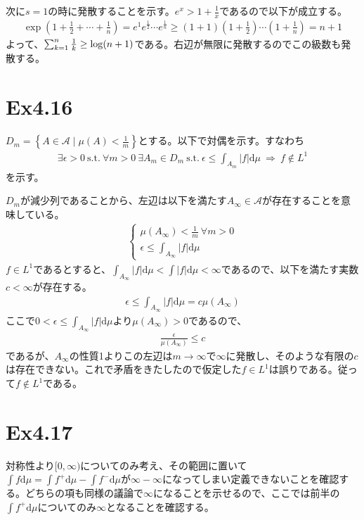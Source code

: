 \documentclass{article}
\begin{document}
次に$s = 1$の時に発散することを示す。$e^x > 1 + \frac{1}{x}$であるので以下が成立する。
\begin{align*}
	\exp \left( 1 + \frac{1}{2} + \cdots + \frac{1}{n} \right) = e^1  e^{\frac{1}{2}}\cdots e^{\frac{1}{n}} \geq (1 + 1) (1 + \frac{1}{2}) \cdots (1 + \frac{1}{n}) = n+1
\end{align*}
よって、$\sum_{k = 1}^{n} \frac{1}{k} \geq {\rm log} (n+1)$である。右辺が無限に発散するのでこの級数も発散する。

\section{Ex4.16}
$D_m = \left\{ A\in \mathcal{A}\mid \mu(A) < \frac{1}{m} \right\}$とする。以下で対偶を示す。すなわち
\begin{align*}
	\exists \epsilon > 0\ \text{s.t.}\ \forall m > 0\ \exists A_m \in D_m\ \text{s.t.}\ \epsilon \leq \int_{A_m} |f| \mathrm{d}\mu\ \Rightarrow\ f\notin L^1
\end{align*}
を示す。

$D_m$が減少列であることから、左辺は以下を満たす$A_{\infty}\in \mathcal{A}$が存在することを意味している。
\begin{align*}
\begin{cases}
	\mu\left( A_{\infty} \right) < \frac{1}{m}\ \forall m > 0\\[8pt]
	\epsilon \leq \int_{A_{\infty}} |f|\mathrm{d} \mu
\end{cases}
\end{align*}
$f\in L^1$であるとすると、$\int_{A_{\infty}} |f|\mathrm{d} \mu < \int |f| \mathrm{d} \mu < \infty$であるので、以下を満たす実数$c< \infty$が存在する。
\begin{align*}
	\epsilon \leq \int_{A_{\infty}} |f|\mathrm{d} \mu = c\mu\left( A_{\infty} \right)
\end{align*}
ここで$0 < \epsilon \leq \int_{A_{\infty}} |f|\mathrm{d} \mu$より$\mu\left( A_{\infty} \right)  > 0$であるので、
\begin{align*}
	\frac{\epsilon}{\mu\left( A_{\infty} \right)} \leq c
\end{align*}
であるが、$A_{\infty}$の性質1よりこの左辺は$m \to \infty$で$\infty$に発散し、そのような有限の$c$は存在できない。これで矛盾をきたしたので仮定した$f \in L^1$は誤りである。従って$f \notin L^1$である。


\section{Ex4.17}
対称性より$[0,\infty)$についてのみ考え、その範囲に置いて$\int f \mathrm{d}\mu = \int f^{+} \mathrm{d}\mu - \int f^{-} \mathrm{d}\mu$が$\infty - \infty$になってしまい定義できないことを確認する。どちらの項も同様の議論で$\infty$になることを示せるので、ここでは前半の$\int f^{+} \mathrm{d}\mu$についてのみ$\infty$となることを確認する。
\end{document}
